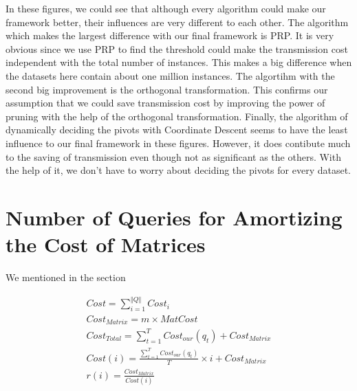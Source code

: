 In these figures, we could see that although every algorithm could make our framework better, their influences are very different to each other.  The algorithm which makes the largest difference with our final framework is PRP.  It is very obvious since we use PRP to find the threshold could make the transmission cost independent with the total number of instances.  This makes a big difference when the datasets here contain about one million instances.  The algortihm with the second big improvement is the orthogonal transformation.  This confirms our assumption that we could save transmission cost by improving the power of pruning with the help of the orthogonal transformation.  Finally, the algorithm of dynamically deciding the pivots with Coordinate Descent seems to have the least influence to our final framework in these figures.  However, it does contibute much to the saving of transmission even though not as significant as the others.  With the help of it, we don't have to worry about deciding the pivots for every dataset.


\section{Number of Queries for Amortizing the Cost of Matrices} %
\label{s:number_of_queries_for_amortizing_the_cost_of_matrices}

We mentioned in the section 


\begin{equation}
\begin{aligned}
	Cost = \sum^{\Vert Q\Vert}_{i=1}{Cost_i} \\
	Cost_{Matrix} = m\times MatCost \\
	Cost_{Total} = \sum_{t=1}^T{Cost_{our}(q_t)} + Cost_{Matrix} \\
	Cost(i) = \frac{\sum_{t=1}^T{Cost_{our}(q_t)}}{T}\times i + Cost_{Matrix} \\
	r(i)=\frac{Cost_{Matrix}}{Cost(i)}
\end{aligned}
\end{equation}

